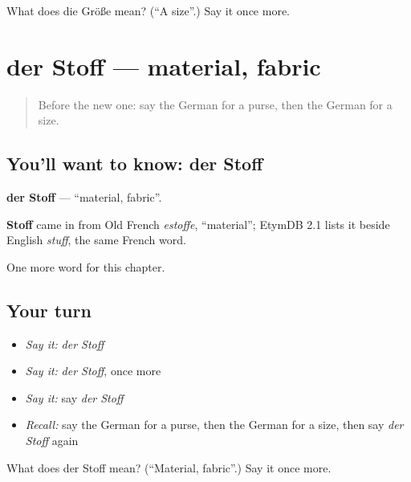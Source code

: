 \begin{tcolorbox}[breakable,colback=teal!4,colframe=teal!35!black,title={Before you move on}]
What does die Größe mean? (\textquotedblleft{}A size\textquotedblright{}.) Say it once more.
\end{tcolorbox}
\section[der Stoff]{der Stoff — material, fabric}

\label{lesson:GE-C203-stoff}



\begin{quote}
Before the new one: say the German for a purse, then the German for a size.
\end{quote}

\subsection*{You'll want to know: der Stoff}
\textbf{der Stoff} — \textquotedblleft{}material, fabric\textquotedblright{}.

\begin{cousinweb}
\textbf{Stoff} came in from Old French \emph{estoffe}, \textquotedblleft{}material\textquotedblright{}; EtymDB 2.1 lists it beside English \emph{stuff}, the same French word.
\end{cousinweb}

\begin{grammarlens}[title={What you've built}]
One more word for this chapter.
\end{grammarlens}

\subsection*{Your turn}
\begin{itemize}
\raggedright
  \item \emph{Say it:} \emph{der Stoff}
  \item \emph{Say it:} \emph{der Stoff}, once more
  \item \emph{Say it:} say \emph{der Stoff}
  \item \emph{Recall:} say the German for a purse, then the German for a size, then say \emph{der Stoff} again
\end{itemize}

\begin{tcolorbox}[breakable,colback=teal!4,colframe=teal!35!black,title={Before you move on}]
What does der Stoff mean? (\textquotedblleft{}Material, fabric\textquotedblright{}.) Say it once more.
\end{tcolorbox}

